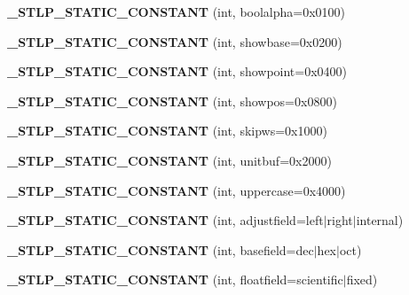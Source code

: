 \begin{DoxyCompactItemize}
{\bfseries \+\_\+\+S\+T\+L\+P\+\_\+\+S\+T\+A\+T\+I\+C\+\_\+\+C\+O\+N\+S\+T\+A\+NT} (int, boolalpha=0x0100)
\item 
\mbox{\label{classios__base_a16de713b94c53f44eca7d2d79ce16cda}} 
{\bfseries \+\_\+\+S\+T\+L\+P\+\_\+\+S\+T\+A\+T\+I\+C\+\_\+\+C\+O\+N\+S\+T\+A\+NT} (int, showbase=0x0200)
\item 
\mbox{\label{classios__base_a56d4607e91af47fc724d551449752c9a}} 
{\bfseries \+\_\+\+S\+T\+L\+P\+\_\+\+S\+T\+A\+T\+I\+C\+\_\+\+C\+O\+N\+S\+T\+A\+NT} (int, showpoint=0x0400)
\item 
\mbox{\label{classios__base_a41912af27ccb65faee6dd1056cbf2351}} 
{\bfseries \+\_\+\+S\+T\+L\+P\+\_\+\+S\+T\+A\+T\+I\+C\+\_\+\+C\+O\+N\+S\+T\+A\+NT} (int, showpos=0x0800)
\item 
\mbox{\label{classios__base_ae6c156216de2f66424b0acbfb2a13211}} 
{\bfseries \+\_\+\+S\+T\+L\+P\+\_\+\+S\+T\+A\+T\+I\+C\+\_\+\+C\+O\+N\+S\+T\+A\+NT} (int, skipws=0x1000)
\item 
\mbox{\label{classios__base_a41e1e59fbe60a178f6673549442cd3c5}} 
{\bfseries \+\_\+\+S\+T\+L\+P\+\_\+\+S\+T\+A\+T\+I\+C\+\_\+\+C\+O\+N\+S\+T\+A\+NT} (int, unitbuf=0x2000)
\item 
\mbox{\label{classios__base_a41b5f0432db60f56f9fcf0cc53ce1c5f}} 
{\bfseries \+\_\+\+S\+T\+L\+P\+\_\+\+S\+T\+A\+T\+I\+C\+\_\+\+C\+O\+N\+S\+T\+A\+NT} (int, uppercase=0x4000)
\item 
\mbox{\label{classios__base_a56c80ebfb198307723c2d423de8385dd}} 
{\bfseries \+\_\+\+S\+T\+L\+P\+\_\+\+S\+T\+A\+T\+I\+C\+\_\+\+C\+O\+N\+S\+T\+A\+NT} (int, adjustfield=left$\vert$right$\vert$internal)
\item 
\mbox{\label{classios__base_a12048c7e12be15e7c28216e5bae54209}} 
{\bfseries \+\_\+\+S\+T\+L\+P\+\_\+\+S\+T\+A\+T\+I\+C\+\_\+\+C\+O\+N\+S\+T\+A\+NT} (int, basefield=dec$\vert$hex$\vert$oct)
\item 
\mbox{\label{classios__base_ab08139e5ce09f5c8db5bb85020f324a7}} 
{\bfseries \+\_\+\+S\+T\+L\+P\+\_\+\+S\+T\+A\+T\+I\+C\+\_\+\+C\+O\+N\+S\+T\+A\+NT} (int, floatfield=scientific$\vert$fixed)

\end{DoxyCompactItemize}
